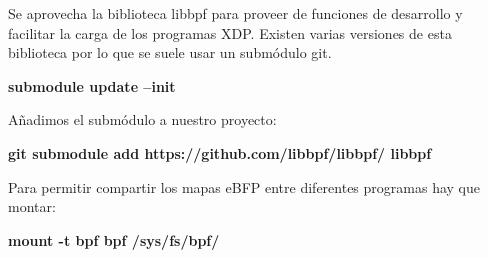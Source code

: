 Se aprovecha la biblioteca libbpf para proveer de funciones de desarrollo y facilitar la carga de los programas XDP. Existen varias versiones de esta biblioteca por lo que se suele usar un submódulo git.
\begin{center}
    \textbf{submodule update --init}
\end{center}
Añadimos el submódulo a nuestro proyecto:
\begin{center}
    \textbf{git submodule add https://github.com/libbpf/libbpf/ libbpf}
\end{center}
Para permitir compartir los mapas eBFP entre diferentes programas hay que montar:  
\begin{center}
    \textbf{mount -t bpf bpf /sys/fs/bpf/}
\end{center}